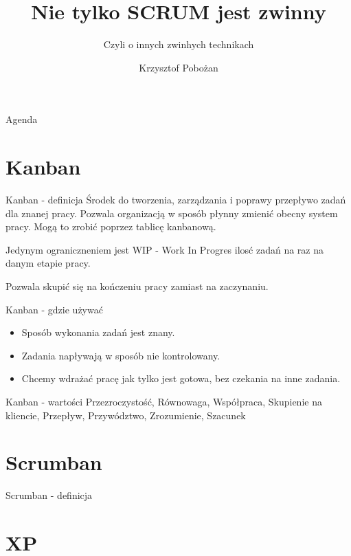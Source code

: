 \documentclass[epic,eepic,aspectratio=169,12pt]{beamer}
\title{Nie tylko SCRUM jest zwinny}
\author{Krzysztof Pobożan}
\subtitle{Czyli o innych zwinhych technikach}
\begin{document}
\begin{frame}
	\maketitle
\end{frame}
	\begin{frame}{Agenda}
		\tableofcontents
	\end{frame}
\section{Kanban}
\begin{frame}{Kanban - definicja}
	Środek do tworzenia, zarządzania i poprawy przepływo zadań dla znanej pracy.
	Pozwala organizacją w sposób płynny zmienić obecny system pracy. 
	Mogą to zrobić poprzez tablicę kanbanową.
	
	Jedynym ograniczneniem jest WIP - Work In Progres ilosć zadań na raz na danym etapie pracy.
	
	Pozwala skupić się na kończeniu pracy zamiast na zaczynaniu.
	
\end{frame}
\begin{frame}{Kanban - gdzie używać}
	\begin{itemize}
		\item Sposób wykonania zadań jest znany.
		\item Zadania napływają w sposób nie kontrolowany.
		\item Chcemy wdrażać pracę jak tylko jest gotowa, bez czekania na inne zadania.
	\end{itemize}
\end{frame}
\begin{frame}{Kanban - wartości}
	Przezroczystość, Równowaga, Współpraca, Skupienie na kliencie, Przepływ, Przywództwo, Zrozumienie, Szacunek
\end{frame}
\section{Scrumban}
\begin{frame}{Scrumban - definicja}
	
\end{frame}
\section{XP}
\end{document}
